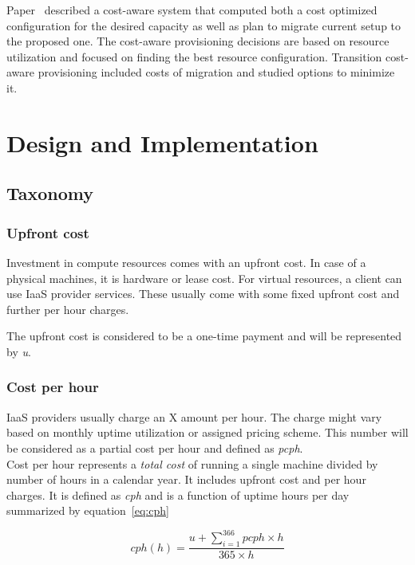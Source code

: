 \documentclass[]{final_report}
\begin{document}
Paper~\cite{5961733} described a cost-aware system that computed both a cost optimized configuration for the desired capacity as well as plan to migrate current setup to the proposed one. The cost-aware provisioning decisions are based on resource utilization and focused on finding the best resource configuration. Transition cost-aware provisioning included costs of migration and studied options to minimize it. 




\chapter{Design and Implementation}

\section{Taxonomy}

\subsection{Upfront cost}

Investment in compute resources comes with an upfront cost. In case of a physical machines, it is hardware or lease cost. For virtual resources, a client can use IaaS provider services. These usually come with some fixed upfront cost and further per hour charges. \par

The upfront cost is considered to be a one-time payment and will be represented by \textit{u}.

\subsection{Cost per hour}

IaaS providers usually charge an X amount per hour. The charge might vary based on monthly uptime utilization or assigned pricing scheme. This number will be considered as a partial cost per hour and defined as \textit{pcph}. \\
Cost per hour represents a \textit{total cost} of running a single machine divided by number of hours in a calendar year. It includes upfront cost and per hour charges. It is defined as \textit{cph} and is a function of uptime hours per day summarized by equation~\ref{eq:cph}

\begin{equation}
\label{eq:cph}
cph(h) = \frac{u + \sum_{i=1}^{366} pcph \times h}{365 \times h}
\end{equation}
\end{document}
